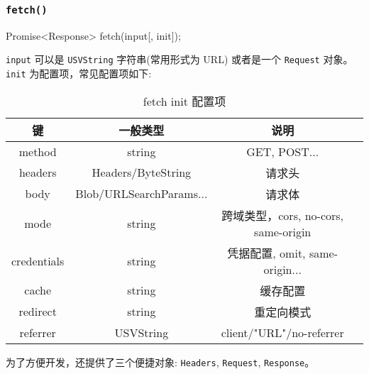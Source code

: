 \subsubsection*{\texttt{fetch()}}

\begin{JavaScript}
Promise<Response> fetch(input[, init]);
\end{JavaScript}

\texttt{input} 可以是 \texttt{USVString} 字符串(常用形式为 URL) 或者是一个 \texttt{Request} 对象。 \texttt{init} 为配置项，常见配置项如下:

\begin{table}[H]
  \small
  \centering
  \caption{fetch init 配置项}
  \label{table:fetch init 配置项}
  \setlength{\tabcolsep}{4mm}
  \begin{tabular}{c|ccc}
    \toprule
    \textbf{键} & \textbf{一般类型} & \textbf{说明} \\
    \midrule
    method & string & GET, POST... \\
    headers & Headers/ByteString & 请求头 \\
    body & Blob/URLSearchParams...  & 请求体 \\
    \midrule
    mode & string & 跨域类型，cors, no-cors, same-origin \\
    credentials & string & 凭据配置, omit, same-origin...\\
    cache & string & 缓存配置 \\
    redirect & string & 重定向模式 \\
    referrer & USVString & client/"URL"/no-referrer \\
    \bottomrule
  \end{tabular}
\end{table}

为了方便开发，还提供了三个便捷对象: \texttt{Headers}, \texttt{Request}, \texttt{Response}。

\newpage
